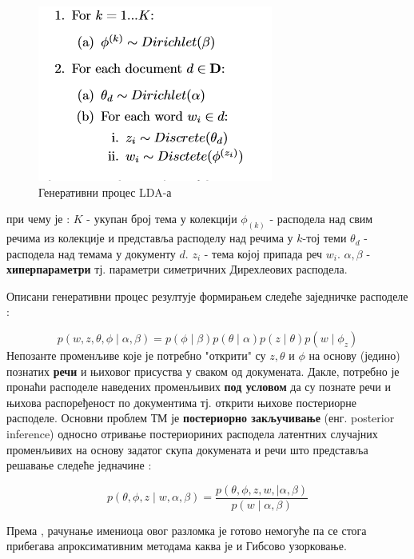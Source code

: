\begin{figure}[H]
  \includegraphics[scale=0.8]{./Slike/slika27.png} 
  \caption{Генеративни процес LDA-а }\label{fig:slika27}
\end{figure}

при чему је :
$K$ - укупан број тема у колекцији
$\phi_{(k)}$ -  расподела над свим речима из колекције и представља расподелу над речима у $k$-тој теми
$\theta_d$ - расподела над темама у документу $d$.
$z_i$ - тема којој припада реч $w_i$.
$\alpha,\beta$ - \textbf{хиперпараметри} тј. параметри симетричних Дирехлеових расподела.

Описани генеративни процес резултује формирањем следеће заједничке расподеле :

\begin{equation}
p(w,z,\theta,\phi \mid \alpha,\beta) = p(\phi \mid \beta)p(\theta \mid \alpha)p(z \mid \theta)p(w \mid \phi_z)
\end{equation}
Непозанте променљиве које је потребно "открити" су $z,\theta$ и $\phi$ на основу (једино) познатих  \textbf{речи} и њиховог присуства у сваком од докумената. Дакле, потребно је пронаћи расподеле наведених променљивих \textbf{под условом} да су познате речи и њихова распоређеност по документима тј. открити њихове постериорне расподеле.
Основни проблем ТМ је  \textbf{постериорно закључивање} (енг. posterior inference) односно отривање постериориних расподела латентних случајних променљивих на основу задатог скупа докумената и речи што представља решавање следеће једначине :

\begin{equation}
p(\theta,\phi,z \mid w,\alpha,\beta) =\frac{p(\theta,\phi,z,w,\mid \alpha,\beta)}{p(w \mid \alpha,\beta)}
\end{equation}

Према  \cite{verov9}, рачунање имениоца овог разломка је готово немогуће па се стога прибегава апроксимативним методама каква је и Гибсово узорковање.

